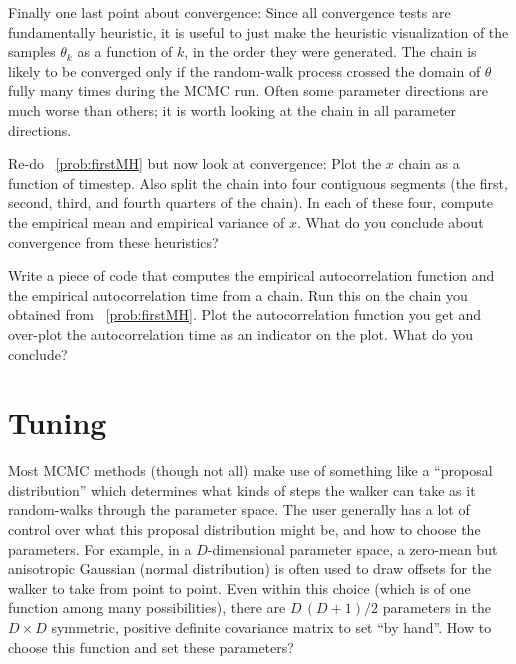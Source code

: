 \documentclass[12pt,twoside,pdftex]{article}
\newcommand{\pars}{\theta}
\begin{document}
Finally one last point about convergence:
Since all convergence tests are fundamentally heuristic, it is useful
to just make the heuristic visualization of the samples $\pars_k$ as a
function of $k$, in the order they were generated.
The chain is likely to be converged only if the random-walk process
crossed the domain of $\pars$ fully many times during the MCMC run.
Often some parameter directions are much worse than others; it is
worth looking at the chain in all parameter directions.

\begin{problem}
Re-do \problemname~\ref{prob:firstMH} but now look at convergence:
Plot the $x$ chain as a function of timestep.  Also split the chain
into four contiguous segments (the first, second, third, and fourth
quarters of the chain).  In each of these four, compute the empirical
mean and empirical variance of $x$.  What do you conclude about
convergence from these heuristics?
\end{problem}

\begin{problem}
Write a piece of code that computes the empirical autocorrelation
function and the empirical autocorrelation time from a chain.  Run
this on the chain you obtained from \problemname~\ref{prob:firstMH}.
Plot the autocorrelation function you get and over-plot the
autocorrelation time as an indicator on the plot.  What do you
conclude?
\end{problem}

\section{Tuning}\label{sec:tuning}

Most MCMC methods
  (though not all)
  make use of something like a ``proposal distribution''
  which determines what kinds of steps the walker can take
  as it random-walks through the parameter space.
The user generally has a lot of control over what this proposal distribution might be,
  and how to choose the parameters.
For example, in a $D$-dimensional parameter space, %
  a zero-mean but anisotropic Gaussian (normal distribution)
  is often used to draw offsets for the walker to take from point to point.
Even within this choice (which is of one function among many possibilities),
  there are $D\,(D+1)/2$ parameters in the $D\times D$ symmetric, positive definite covariance matrix
  to set ``by hand''.
How to choose this function and set these parameters?
\end{document}
